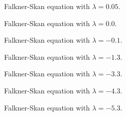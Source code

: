 \begin{figure}[h]
	\centering
	\def\svgwidth{\textwidth}
	
	\caption{Falkner-Skan equation with $\lambda = 0.05$.}
\end{figure}

\begin{figure}[h]
	\centering
	\def\svgwidth{\textwidth}
	
	\caption{Falkner-Skan equation with $\lambda = 0.0$.}
\end{figure}

\begin{figure}[h]
	\centering
	\def\svgwidth{\textwidth}
	
	\caption{Falkner-Skan equation with $\lambda = -0.1$.}
\end{figure}

\begin{figure}[h]
	\centering
	\def\svgwidth{\textwidth}
	
	\caption{Falkner-Skan equation with $\lambda = -1.3$.}
\end{figure}

\begin{figure}[h]
	\centering
	\def\svgwidth{\textwidth}
	
	\caption{Falkner-Skan equation with $\lambda = -3.3$.}
\end{figure}

\begin{figure}[h]
	\centering
	\def\svgwidth{\textwidth}
	
	\caption{Falkner-Skan equation with $\lambda = -4.3$.}
\end{figure}

\begin{figure}[h]
	\centering
	\def\svgwidth{\textwidth}
	
	\caption{Falkner-Skan equation with $\lambda = -5.3$.}
\end{figure}
